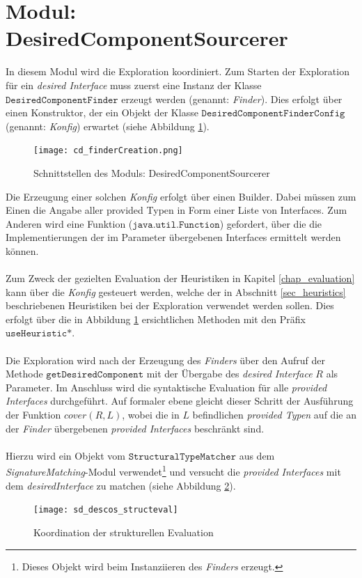 {{\section{Modul: DesiredComponentSourcerer}
In diesem Modul wird die Exploration koordiniert. Zum Starten der Exploration für ein \emph{desired Interface} muss zuerst eine Instanz der Klasse $\texttt{DesiredComponentFinder}$ erzeugt werden (genannt: \emph{Finder}). Dies erfolgt über einen Konstruktor, der ein Objekt der Klasse $\texttt{DesiredComponentFinderConfig}$ (genannt: \emph{Konfig}) erwartet (siehe Abbildung \ref{cd_finderCreation}). 
\begin{figure}[h!]
\centering
\texttt{[image: cd\_finderCreation.png]}
\caption{Schnittstellen des Moduls: DesiredComponentSourcerer}
\label{cd_finderCreation}
\end{figure}
\noindent
Die Erzeugung einer solchen \emph{Konfig} erfolgt über einen Builder. Dabei müssen zum Einen die Angabe aller provided Typen in Form einer Liste von Interfaces. Zum Anderen wird eine Funktion ($\texttt{java.util.Function}$) gefordert, über die die Implementierungen der im Parameter übergebenen Interfaces ermittelt werden können.
\\\\
Zum Zweck der gezielten Evaluation der Heuristiken in Kapitel \ref{chap_evaluation} kann über die \emph{Konfig} gesteuert werden, welche der in Abschnitt \ref{sec_heuristics} beschriebenen Heuristiken bei der Exploration verwendet werden sollen. Dies erfolgt über die in Abbildung \ref{cd_finderCreation} ersichtlichen Methoden mit den Präfix $\texttt{useHeuristic*}$.
\\\\
Die Exploration wird nach der Erzeugung des \emph{Finders} über den Aufruf der Methode $\texttt{getDesiredComponent}$ mit der Übergabe des \emph{desired Interface} $R$ als Parameter. Im Anschluss wird die syntaktische Evaluation für alle \emph{provided Interfaces} durchgeführt. Auf formaler ebene gleicht dieser Schritt der Ausführung der Funktion $\mathit{cover(R,L)}$, wobei die in $L$ befindlichen \emph{provided Typen} auf die an der \emph{Finder} übergebenen \emph{provided Interfaces} beschränkt sind.
\\\\
Hierzu wird ein Objekt vom $\texttt{StructuralTypeMatcher}$ aus dem \emph{SignatureMatching}-Modul verwendet\footnote{Dieses Objekt wird beim Instanziieren des \emph{Finders} erzeugt.} und versucht die \emph{provided Interfaces} mit dem \emph{desiredInterface} zu matchen (siehe Abbildung \ref{sd_descos_structeval}).
\begin{figure}
\texttt{[image: sd\_descos\_structeval]}
\caption{Koordination der strukturellen Evaluation}
\label{sd_descos_structeval}
\end{figure}

}}
